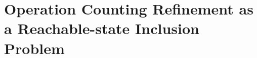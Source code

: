 

%
%

\section{Operation Counting Refinement as a Reachable-state Inclusion Problem}
\label{sec:client}

